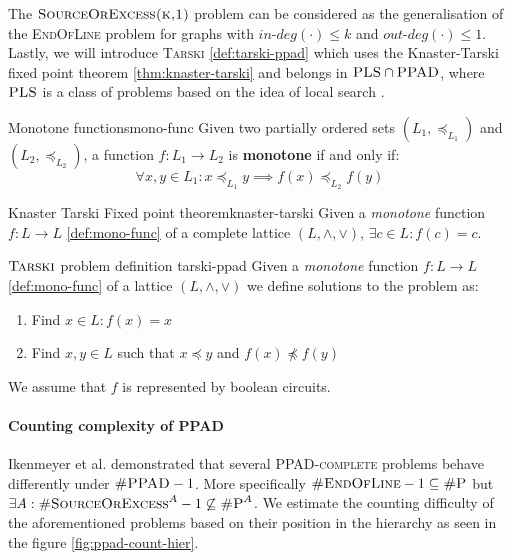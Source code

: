 The $\textsc{SourceOrExcess(k,1)}$ problem can be considered as the generalisation of the \textsc{EndOfLine}
problem for graphs with $\textit{in-deg}(\cdot) \leq k$ and $\textit{out-deg}(\cdot) \leq 1$.
Lastly, we will introduce \textsc{Tarski} \ref{def:tarski-ppad}
which uses the Knaster-Tarski fixed point theorem \ref{thm:knaster-tarski} and
belongs in $\textsc{PLS} \cap \textsc{PPAD}$,
where  $\textsc{PLS}$ is a class of problems based on the idea of local search \cite{johnson_HowEasyLocal_1988}.
%
%
\begin{definitionbox}{Monotone functions}{mono-func}
    Given two partially ordered sets $(L_1, \preceq_{L_1})$ and $(L_2, \preceq_{L_2})$, a function
    $f: L_1 \to L_2$ is \textbf{monotone} if and only if:
    $$
        \forall x,y \in L_1: x \preceq_{L_1} y \implies f(x) \preceq_{L_2} f(y)
    $$
\end{definitionbox}
%     
%
\begin{theorembox}{Knaster Tarski Fixed point theorem\cite{bronislaw_TheoremeFunctionsDensembles_1928, fearnley_FasterAlgorithmFinding_2022}}{knaster-tarski}
    Given a \textit{monotone} function $f: L \to L$ \ref{def:mono-func} of a complete lattice $(L, \wedge, \vee)$,  $\exists c \in L: f(c) = c$.
\end{theorembox}

\begin{definitionbox}{$\textnormal{\textsc{Tarski}}$ problem definition \cite{fearnley_FasterAlgorithmFinding_2022}}{tarski-ppad}
    Given a \textit{monotone} function $f: L \to L$ \ref{def:mono-func} of a lattice $(L, \wedge, \vee)$
    we define solutions to the problem as:
    \begin{enumerate}
        \item Find $x \in L: f(x) = x$
        \item Find $x,y \in L$ such that $x \preceq y$ and $f(x) \not\preceq f(y)$
    \end{enumerate}
    We assume that $f$ is represented by boolean circuits.
\end{definitionbox}
%
\paragraph{Counting complexity of PPAD}
\label{par:count-ppad}


Ikenmeyer et al. \cite{ikenmeyer_WhatWhatNot_2022} demonstrated that several \textsc{PPAD-complete}
problems behave differently under $\textsc{\#PPAD} -1$. More specifically
$\textsc{\#EndOfLine} - 1 \subseteq \textsc{\#P}$ but $\exists A: \textsc{\#SourceOrExcess}^A  - 1\not\subseteq \textsc{\#P}^A$.
We estimate the counting difficulty of the aforementioned problems based on their position in the hierarchy as seen in the figure \ref{fig:ppad-count-hier}.

